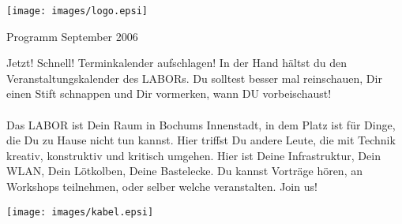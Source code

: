 \documentclass[10pt,landscape,a4paper]{article}
\begin{document}
\begin{multicols}{3}
\vskip 2cm




\begin{center}
\centering \texttt{[image: images/logo.epsi]}
\end{center}

\vskip 5mm

{\centering \huge Programm September 2006} %

\vskip 5mm

Jetzt! Schnell! Terminkalender aufschlagen! In der Hand h\"altst du den
Veranstaltungskalender des LABORs. Du solltest besser mal reinschauen,
Dir einen Stift schnappen und Dir vormerken, wann DU vorbeischaust! \\
\\
Das LABOR ist Dein Raum in Bochums Innenstadt, in dem Platz ist f\"ur
Dinge, die Du zu Hause nicht tun kannst. Hier triffst Du andere Leute,
die mit Technik kreativ, konstruktiv und kritisch umgehen. Hier ist
Deine Infrastruktur, Dein WLAN, Dein L\"otkolben, Deine Bastelecke. Du
kannst Vortr\"age h\"oren, an Workshops teilnehmen, oder selber welche
veranstalten. Join us! \\

\begin{center}
\centering \texttt{[image: images/kabel.epsi]}
\end{center}


\end{multicols}
\end{document}
